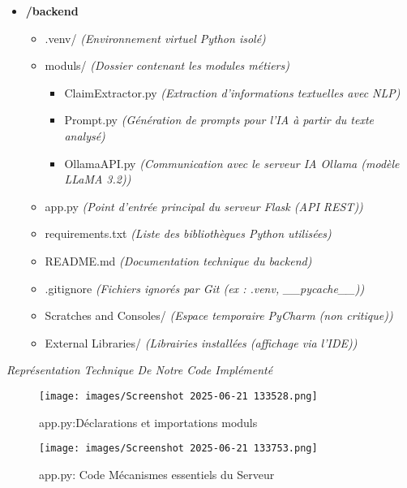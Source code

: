 \begin{description}
\begin{description}
\begin{itemize}
    \item \textbf{/backend}
    \begin{itemize}
        \item .venv/ \quad \textit{(Environnement virtuel Python isolé)}
        \item moduls/ \quad \textit{(Dossier contenant les modules métiers)}
        \begin{itemize}
            \item ClaimExtractor.py \quad \textit{(Extraction d'informations textuelles avec NLP)}
            \item Prompt.py \quad \textit{(Génération de prompts pour l'IA à partir du texte analysé)}
            \item OllamaAPI.py \quad \textit{(Communication avec le serveur IA Ollama (modèle LLaMA 3.2))}
        \end{itemize}
        \item app.py \quad \textit{(Point d'entrée principal du serveur Flask (API REST))}
        \item requirements.txt \quad \textit{(Liste des bibliothèques Python utilisées)}
        \item README.md \quad \textit{(Documentation technique du backend)}
        \item .gitignore \quad \textit{(Fichiers ignorés par Git (ex : .venv, \_\_pycache\_\_))}
        \item Scratches and Consoles/ \quad \textit{(Espace temporaire PyCharm (non critique))}
        \item External Libraries/ \quad \textit{(Librairies installées (affichage via l'IDE))}
    \end{itemize}
    
\end{itemize}
\item \textit{Représentation Technique De Notre Code Implémenté} 
\begin{figure}[H]
    \centering
    \texttt{[image: images/Screenshot 2025-06-21 133528.png]} 
    \caption{app.py:Déclarations et importations moduls} %
    \label{fig:logos} %
\end{figure}
\begin{figure}[H]
    \centering
    \texttt{[image: images/Screenshot 2025-06-21 133753.png]} 
    \caption{app.py: Code Mécanismes essentiels du Serveur} %
    \label{fig:logos} %
\end{figure}


\end{description}
\end{description}
